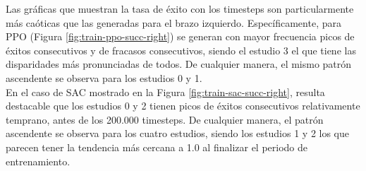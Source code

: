 Las gráficas que muestran la tasa de éxito con los timesteps son particularmente más caóticas que las generadas para el brazo izquierdo. Específicamente, para PPO (Figura \ref{fig:train-ppo-succ-right}) se generan con mayor frecuencia picos de éxitos consecutivos y de fracasos consecutivos, siendo el estudio 3 el que tiene las disparidades más pronunciadas de todos. De cualquier manera, el mismo patrón ascendente se observa para los estudios 0 y 1. \\

En el caso de SAC mostrado en la Figura \ref{fig:train-sac-succ-right}, resulta destacable que los estudios 0 y 2 tienen picos de éxitos consecutivos relativamente temprano, antes de los 200.000 timesteps. De cualquier manera, el patrón ascendente se observa para los cuatro estudios, siendo los estudios 1 y 2 los que parecen tener la tendencia más cercana a 1.0 al finalizar el periodo de entrenamiento.\\

